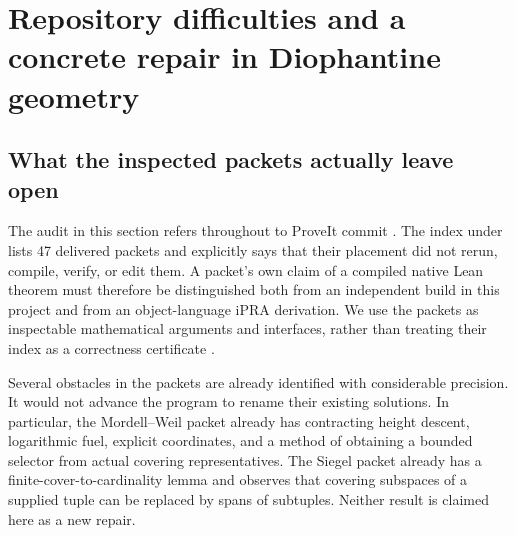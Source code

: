 \section{Repository difficulties and a concrete repair in Diophantine geometry}
\label{sec:repository-repair}

\subsection{What the inspected packets actually leave open}

The audit in this section refers throughout to ProveIt commit
.
The index under 
lists 47 delivered packets and explicitly says that their placement did
not rerun, compile, verify, or edit them.  A packet's own claim of a
compiled native Lean theorem must therefore be distinguished both from an
independent build in this project and from an object-language iPRA
derivation.  We use the packets as inspectable mathematical arguments and
interfaces, rather than treating their index as a correctness certificate
\cite{ProveIt}.

Several obstacles in the packets are already identified with considerable
precision.  It would not advance the program to rename their existing
solutions.  In particular, the Mordell--Weil packet already has contracting
height descent, logarithmic fuel, explicit coordinates, and a method of
obtaining a bounded selector from actual covering representatives.  The
Siegel packet already has a finite-cover-to-cardinality lemma and observes
that covering subspaces of a supplied tuple can be replaced by spans of
subtuples.  Neither result is claimed here as a new repair.

